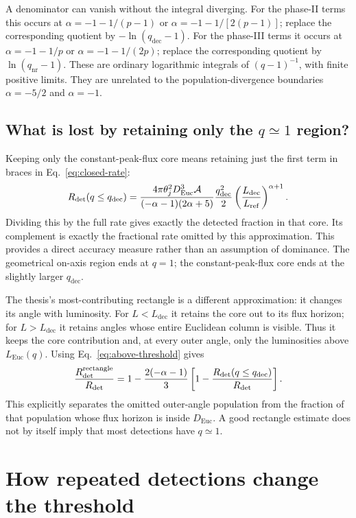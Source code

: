\documentclass[11pt,a4paper]{article}
\newcommand{\Euc}{\mathrm{Euc}}
\newcommand{\dec}{\mathrm{dec}}
\newcommand{\nr}{\mathrm{nr}}
\newcommand{\Lref}{L_{\mathrm{ref}}}
\newcommand{\Ldec}{L_{\mathrm{dec}}}
\newcommand{\Rdet}{R_{\mathrm{det}}}
\begin{document}
A denominator can vanish without the integral diverging. For the phase-II
terms this occurs at $\alpha=-1-1/(p-1)$ or
$\alpha=-1-1/[2(p-1)]$; replace the corresponding quotient by
$-\ln(q_\dec-1)$. For the phase-III terms it occurs at
$\alpha=-1-1/p$ or $\alpha=-1-1/(2p)$; replace the corresponding quotient
by $\ln(q_\nr-1)$. These are ordinary logarithmic integrals of
$(q-1)^{-1}$, with finite positive limits. They are unrelated to the
population-divergence boundaries $\alpha=-5/2$ and $\alpha=-1$.

\subsection{What is lost by retaining only the $q\simeq1$ region?}
Keeping only the constant-peak-flux core means retaining just the first
term in braces in Eq.~\eqref{eq:closed-rate}:
\begin{equation}
 R_{\rm det}(q\le q_\dec)=
 \frac{4\pi\theta_j^2D_\Euc^3\mathcal A}
 {(-\alpha-1)(2\alpha+5)}
 \frac{q_\dec^2}{2}\left(\frac{\Ldec}{\Lref}\right)^{\alpha+1}.
 \label{eq:core}
\end{equation}
Dividing this by the full rate gives exactly the detected fraction in that
core. Its complement is exactly the fractional rate omitted by this
approximation. This provides a direct accuracy measure rather than an
assumption of dominance. The geometrical on-axis region ends at $q=1$;
the constant-peak-flux core ends at the slightly larger $q_\dec$.

The thesis's most-contributing rectangle is a different approximation:
it changes its angle with luminosity. For $L<\Ldec$ it retains the core
out to its flux horizon; for $L>\Ldec$ it retains angles whose entire
Euclidean column is visible. Thus it keeps the core contribution and,
at every outer angle, only the luminosities above $L_\Euc(q)$.
Using Eq.~\eqref{eq:above-threshold} gives
\begin{equation}
 \frac{R_{\rm det}^{\rm rectangle}}{\Rdet}
 =1-\frac{2(-\alpha-1)}3
 \left[1-\frac{R_{\rm det}(q\le q_\dec)}{\Rdet}\right].
 \label{eq:rectangle}
\end{equation}
This explicitly separates the omitted outer-angle population from the
fraction of that population whose flux horizon is inside $D_\Euc$.
A good rectangle estimate does not by itself imply that most detections
have $q\simeq1$.


\section{How repeated detections change the threshold}
\label{sec:cadence}
\end{document}
